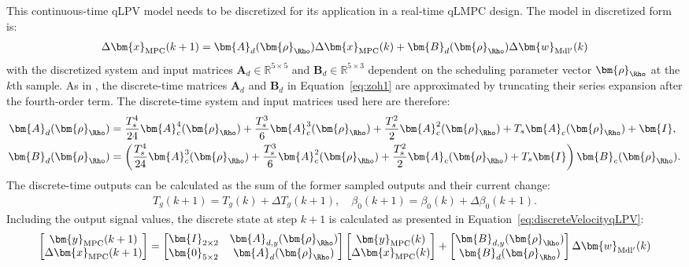 This continuous-time qLPV model needs to be discretized for its application in a real-time qLMPC design. The model in discretized form is:
\begin{align}\label{eq4:DiscreteForm}
    \Delta \bm{x}_{\text{MPC}}(k+1) = \bm{A}_{d}(\bm{\rho}_\Rho)\Delta \bm{x}_{\text{MPC}}(k) + \bm{B}_{d}(\bm{\rho}_\Rho) \Delta \bm{w}_{\text{Mdl}^\prime}(k)
\end{align}
with the discretized system and input matrices $\bm{A}_d \in \mathbb{R}^{5 \times 5}$ and $\bm{B}_d \in \mathbb{R}^{5 \times 3}$ dependent on the scheduling parameter vector $\bm{\rho}_{\Rho}$ at the $k{\text{th}}$ sample.
%
%
As in \cite{cisneros2019wide}, the discrete-time matrices $\bm{A}_d$ and $\bm{B}_d$ in Equation~\eqref{eq:zoh1} are approximated by truncating their series expansion after the fourth-order term. The discrete-time system and input matrices used here are therefore:
\begin{align*}
    \bm{A}_{d}(\bm{\rho}_\Rho) &= \frac{T_s^4}{24}\bm{A}_c^4(\bm{\rho}_\Rho) + \frac{T_s^3}{6}\bm{A}_c^3(\bm{\rho}_\Rho) + \frac{T_s^2}{2}\bm{A}_c^2(\bm{\rho}_\Rho) + T_s \bm{A}_c(\bm{\rho}_\Rho) + \bm{I},\\
    \bm{B}_{d}(\bm{\rho}_\Rho) &= \left( \frac{T_s^4}{24}\bm{A}_c^3(\bm{\rho}_\Rho) + \frac{T_s^3}{6}\bm{A}_c^2(\bm{\rho}_\Rho) + \frac{T_s^2}{2}\bm{A}_c(\bm{\rho}_\Rho) + T_s \bm{I} \right) \bm{B}_c(\bm{\rho}_\Rho).
\end{align*}
%
The discrete-time outputs can be calculated as the sum of the former sampled outputs and their current change:
\begin{align*}
    T_{g}(k+1) = T_{g}(k) + \Delta T_{g}(k+1), \quad \beta_{0}(k+1) = \beta_{0}(k) + \Delta \beta_{0}(k+1).
\end{align*}
%
Including the output signal values, the discrete state at step $k+1$ is calculated as presented in Equation~\eqref{eq:discreteVelocityqLPV}:
\[
\begin{bmatrix}
    \bm{y}_{\text{MPC}}(k+1) \\
    \Delta \bm{x}_{\text{MPC}}(k+1)
\end{bmatrix} = \begin{bmatrix}
    \bm{I}_{2\times2} & \bm{A}_{d,y}(\bm{\rho}_\Rho) \\
    \bm{0}_{5\times2} & \bm{A}_{d}(\bm{\rho}_\Rho)
\end{bmatrix} \begin{bmatrix}
    \bm{y}_{\text{MPC}}(k) \\
    \Delta \bm{x}_{\text{MPC}}(k)
\end{bmatrix} + \begin{bmatrix}
    \bm{B}_{d,y}(\bm{\rho}_\Rho) \\
    \bm{B}_{d}(\bm{\rho}_\Rho)
\end{bmatrix} \Delta \bm{w}_{\text{Mdl}^\prime}(k)
\]

